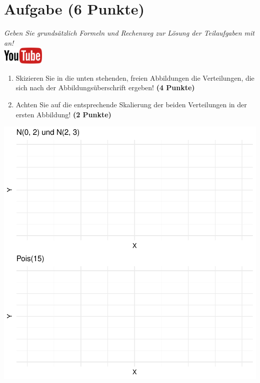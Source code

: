 \documentclass[a4paper, 10pt]{scrartcl}\usepackage[]{graphicx}\usepackage[]{xcolor}
\makeatletter
\def\maxwidth{ %
  \ifdim\Gin@nat@width>\linewidth
    \linewidth
  \else
    \Gin@nat@width
  \fi
}
\makeatother
\begin{document}
\section{Aufgabe \hfill (6 Punkte)}

\textit{Geben Sie grunds{\"a}tzlich Formeln und Rechenweg zur L{\"o}sung der
  Teilaufgaben mit an!} \\[1Ex]

\hfill\href{https://youtu.be/MiD42k4l5Ag}{\includegraphics[width =
  2cm]{img/youtube}}\\[1Ex]



\begin{enumerate}
\item Skizieren Sie in die unten stehenden, freien Abbildungen die
  Verteilungen, die sich nach der Abbildungs{\"u}berschrift ergeben! \textbf{(4
    Punkte)}
\item Achten Sie auf die entsprechende Skalierung der beiden Verteilungen
  in der ersten Abbildung! \textbf{(2 Punkte)}
\end{enumerate}



{\centering \includegraphics[width=\maxwidth]{img/histogram-01-1} 

}
\end{document}
